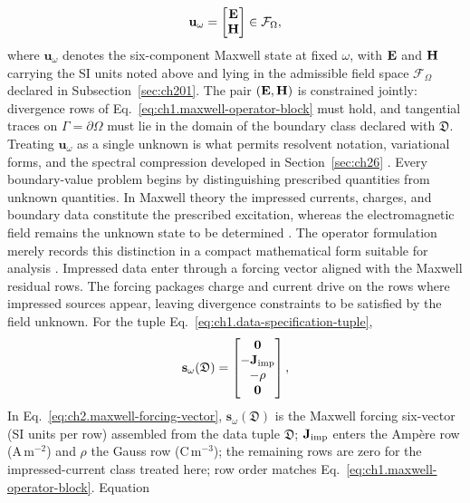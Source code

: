 \begin{equation}
\label{eq:ch2.maxwell-state-vector}
\mathbf{u}_\omega=
\begin{bmatrix}\mathbf{E}\\ \mathbf{H}\end{bmatrix}
\in\mathcal{F}_\Omega,
\end{equation}
where \(\mathbf{u}_\omega\) denotes the six-component Maxwell state at fixed
\(\omega\), with \(\mathbf{E}\) and \(\mathbf{H}\) carrying the SI units noted above and lying in
the admissible field space \(\mathcal{F}_\Omega\) declared in Subsection~\ref{sec:ch201}.
The pair \((\mathbf{E},\mathbf{H})\) is constrained jointly: divergence
rows of Eq.~\eqref{eq:ch1.maxwell-operator-block} must hold, and tangential traces on
\(\Gamma=\partial\Omega\) must lie in the domain of the boundary class declared with
\(\mathfrak{D}\). Treating \(\mathbf{u}_\omega\) as a single unknown is what permits
resolvent notation, variational forms, and the spectral compression developed in
Section~\ref{sec:ch26} \cite{harrington2001}.
Every boundary-value problem begins by distinguishing prescribed quantities from unknown
quantities. In Maxwell theory the impressed currents, charges, and boundary data constitute
the prescribed excitation, whereas the electromagnetic field remains the unknown state to
be determined \cite{maxwell1873}. The operator formulation merely records this
distinction in a compact mathematical form suitable for analysis \cite{harrington2001}.
Impressed data enter through a forcing vector aligned with the Maxwell residual rows.
The forcing packages charge and current drive on the rows where impressed sources
appear, leaving divergence constraints to be satisfied by the field unknown.
For
the tuple Eq.~\eqref{eq:ch1.data-specification-tuple},
\begin{equation}
\label{eq:ch2.maxwell-forcing-vector}
\mathbf{s}_\omega(\mathfrak{D})=
\begin{bmatrix}\mathbf{0}\\ -\mathbf{J}_{\mathrm{imp}}\\ -\rho\\ \mathbf{0}\end{bmatrix},
\end{equation}
In Eq.~\eqref{eq:ch2.maxwell-forcing-vector},
\(\mathbf{s}_\omega(\mathfrak{D})\) is the Maxwell forcing six-vector (SI units per row)
assembled from the data tuple \(\mathfrak{D}\);
\(\mathbf{J}_{\mathrm{imp}}\) enters the Amp\`ere row (A\,m\(^{-2}\)) and \(\rho\) the Gauss row
(C\,m\(^{-3}\)); the remaining rows are zero for the impressed-current class treated here;
row order matches Eq.~\eqref{eq:ch1.maxwell-operator-block}. Equation
